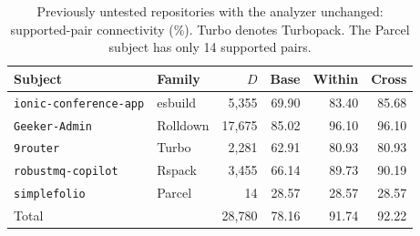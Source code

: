 \begin{table}[t]
\caption{Previously untested repositories with the analyzer unchanged: supported-pair connectivity (\%). Turbo denotes Turbopack. The Parcel subject has only 14 supported pairs.}
\label{tab:simulation-holdout}
\centering\small
\setlength{\tabcolsep}{4pt}
\begin{tabular}{@{}p{.34\linewidth}lrrrr@{}}
\toprule
Subject & Family & $D$ & Base & Within & Cross\\
\midrule
\nolinkurl{ionic-conference-app} & esbuild & 5,355 & 69.90 & 83.40 & 85.68\\
\nolinkurl{Geeker-Admin} & Rolldown & 17,675 & 85.02 & 96.10 & 96.10\\
\nolinkurl{9router} & Turbo & 2,281 & 62.91 & 80.93 & 80.93\\
\nolinkurl{robustmq-copilot} & Rspack & 3,455 & 66.14 & 89.73 & 90.19\\
\nolinkurl{simplefolio} & Parcel & 14 & 28.57 & 28.57 & 28.57\\
\midrule
Total & & 28,780 & 78.16 & 91.74 & 92.22\\
\bottomrule
\end{tabular}
\end{table}
